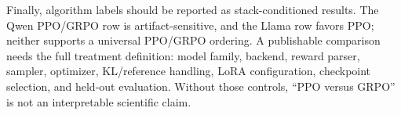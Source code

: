 Finally, algorithm labels should be reported as stack-conditioned results.
The Qwen PPO/GRPO row is artifact-sensitive, and the Llama row favors PPO;
neither supports a universal PPO/GRPO ordering.  A publishable comparison
needs the full treatment definition: model family, backend, reward parser,
sampler, optimizer, KL/reference handling, LoRA configuration, checkpoint
selection, and held-out evaluation.  Without those controls, ``PPO versus
GRPO'' is not an interpretable scientific claim.
